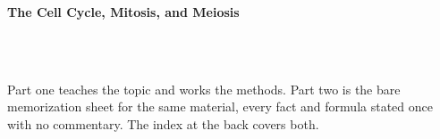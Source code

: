 



\makeindex[title={Index of This Volume},columns=2,intoc]

\begin{titlepage}\thispagestyle{empty}
\vspace*{0.14\textheight}
\noindent{\color{tiercore}\rule{\textwidth}{5pt}}\\[3pt]
\noindent{\color{bioline}\rule{\textwidth}{1pt}}\\[26pt]
\\[12pt]
\noindent\begin{minipage}{\textwidth}\raggedright
{\sffamily\bfseries\fontsize{28}{32}\selectfont\color{bioink}%
 \hyphenchar{} The Cell Cycle, Mitosis, and Meiosis\par}\end{minipage}\\[16pt]
\noindent{\color{biogreen}\rule{\textwidth}{1.4pt}}\\[10pt]
\noindent\begin{minipage}{\textwidth}\raggedright
{\fontsize{10.5}{14}\selectfont\color{biogreen}%
Part one teaches the topic and works the methods. Part two is the bare memorization sheet for the
same material, every fact and formula stated once with no commentary. The index at the back covers both.\par}\end{minipage}
\vfill
\noindent{\color{bioline}\rule{\textwidth}{1pt}}\\[3pt]
\noindent{\color{tiercore}\rule{\textwidth}{5pt}}
\end{titlepage}
\tableofcontents
\clearpage
{}
\clearpage
\printindex

